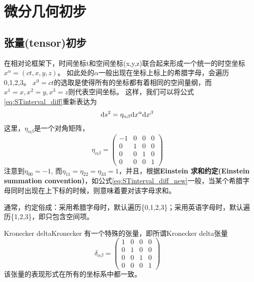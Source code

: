 \section{微分几何初步}
\subsection{张量(tensor)初步}\label{sec:tensor}
在相对论框架下，时间坐标t和空间坐标(x,y,z)联合起来形成一个统一的时空坐标
$x^{\alpha} = (ct,x,y,z)$。
如此处的$\alpha$一般出现在坐标上标上的希腊字母，会遍历{0,1,2,3}。
$x^0= ct$的选取是使得所有的坐标都有着相同的空间量纲，而$x^1 =x, x^2 = y, x^3 = z$则代表空间坐标。
这样，我们可以将公式\ref{eq:STinterval_diff}重新表达为
\begin{equation}\label{eq:STinterval_diff_new}
  {\rm d}s^2 = \eta_ {\alpha \beta}{\rm d}x^\alpha {\rm d} x^\beta
\end{equation}
这里，$\eta_ {\alpha \beta}$是一个对角矩阵，
\begin{equation}\label{eq:Minkowski}
  \eta_{\alpha\beta} ={\begin{pmatrix}
                       -1 & 0 & 0 & 0\\
                        0 & 1 & 0 & 0\\ 
                        0 & 0 & 1 & 0\\
                        0 & 0 & 0 & 1\end{pmatrix}}
\end{equation}
注意到$\eta_{00} = -1$, 而$\eta_{11} = \eta_{22} = \eta_{33} = 1$，并且，根据{\textbf{Einstein 求和约定(Einstein summation convention)}}，如公式\ref{eq:STinterval_diff_new}一般，当某个希腊字母同时出现在上下标的时候，则意味着要对该字母求和。
\begin{remark}
  通常，约定俗成：采用希腊字母时，默认遍历\{0,1,2,3\}；采用英语字母时，默认遍历\{1,2,3\}，即只包含空间项。
\end{remark}

\begin{myprop}{Kronecker delta}{Kronecker}
  有一个特殊的张量，即所谓Kronecker delta张量
\begin{equation}\label{eq:Kronecker}
  \delta_{\alpha\beta} ={\begin{pmatrix}
                        1 & 0 & 0 & 0\\
                        0 & 1 & 0 & 0\\ 
                        0 & 0 & 1 & 0\\
                        0 & 0 & 0 & 1\end{pmatrix}}
\end{equation}
  该张量的表现形式在所有的坐标系中都一致。
\end{myprop}

